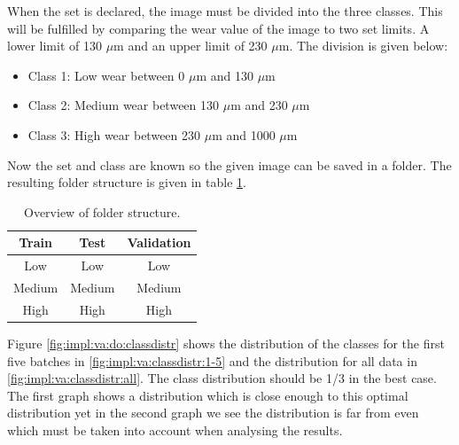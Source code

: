 			When the set is declared, the image must be divided into the three classes. This will be fulfilled by comparing the wear value of the image to two set limits. A lower limit of 130 $\mu$m and an upper limit of 230 $\mu$m. The division is given below:
			\begin{itemize}
				\item Class 1: Low wear between 0 $\mu$m and 130 $\mu$m
				\item Class 2: Medium wear between 130 $\mu$m and 230 $\mu$m
				\item Class 3: High wear between 230 $\mu$m and 1000 $\mu$m
			\end{itemize}		
			
			Now the set and class are known so the given image can be saved in a folder. The resulting folder structure is given in table \ref{tab:impl:visionalgorithms:folderstructure}.
			\begin{table}
			\centering
			\caption{Overview of folder structure.}
			\centering
			\begin{tabular}{c c c}
				Train 	& Test 	& Validation\\ \hline
				Low	& Low & Low \\ 
				Medium & Medium & Medium \\
				High	& High	& High\\
			\end{tabular}
			\label{tab:impl:visionalgorithms:folderstructure}
			\end{table}
			
		 Figure \ref{fig:impl:va:do:classdistr} shows the distribution of the classes for the first five batches in \ref{fig:impl:va:classdistr:1-5} and the distribution for all data in \ref{fig:impl:va:classdistr:all}. The class distribution should be 1/3 in the best case. The first graph shows a distribution which is close enough to this optimal distribution yet in the second graph we see the distribution is far from even which must be taken into account when analysing the results.

